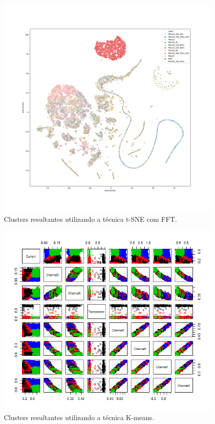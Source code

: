 \begin{figure}[H]
    \caption{Clusters resultantes utilizando a técnica t-SNE com FFT.}
    \begin{center}
        \includegraphics[scale=.25]{resultados/img/fft-t-sne-1.png}
    \end{center}
    \label{fig:}
\end{figure}


\begin{figure}[H]
    \caption{Clusters resultantes utilizando a técnica K-means.}
    \begin{center}
        \includegraphics[scale=.65]{resultados/img/kmeans2.png}
    \end{center}
    \label{fig:}
\end{figure}


